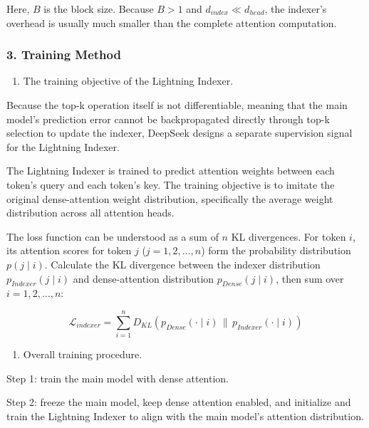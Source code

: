 Here, \(B\) is the block size. Because \(B > 1\) and \(d_{index} \ll d_{head}\), the indexer's overhead is usually much smaller than the complete attention computation.

\hypertarget{training-method}{%
\subsubsection{3. Training Method}\label{training-method}}

\begin{enumerate}
\def\labelenumi{(\arabic{enumi})}
\tightlist
\item
  The training objective of the Lightning Indexer.
\end{enumerate}

Because the top-k operation itself is not differentiable, meaning that the main model's prediction error cannot be backpropagated directly through top-k selection to update the indexer, DeepSeek designs a separate supervision signal for the Lightning Indexer.

The Lightning Indexer is trained to predict attention weights between each token's query and each token's key. The training objective is to imitate the original dense-attention weight distribution, specifically the average weight distribution across all attention heads.

The loss function can be understood as a sum of \(n\) KL divergences. For token \(i\), its attention scores for token \(j\) (\(j = 1, 2, \ldots, n\)) form the probability distribution \(p(j \mid i)\). Calculate the KL divergence between the indexer distribution \(p_{Indexer}(j \mid i)\) and dense-attention distribution \(p_{Dense}(j \mid i)\), then sum over \(i = 1, 2, \ldots, n\):

\[
\mathcal{L}_{indexer}
= \sum_{i=1}^{n} D_{KL}\left(p_{Dense}(\cdot \mid i) \,\|\, p_{Indexer}(\cdot \mid i)\right)
\]

\begin{enumerate}
\def\labelenumi{(\arabic{enumi})}
\setcounter{enumi}{1}
\tightlist
\item
  Overall training procedure.
\end{enumerate}

Step 1: train the main model with dense attention.

Step 2: freeze the main model, keep dense attention enabled, and initialize and train the Lightning Indexer to align with the main model's attention distribution.

